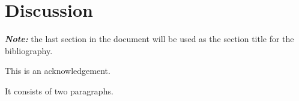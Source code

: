 \documentclass[12pt,halfline,a4paper,]{ouparticle}
\begin{document}
\hypertarget{discussion}{%
\section{Discussion}\label{discussion}}

\textbf{\emph{Note:}} the last section in the document will be used as
the section title for the bibliography.


\begin{notes}[Acknowledgements]
This is an acknowledgement.

It consists of two paragraphs.
\end{notes}


\renewcommand\refname{References}


\end{document}
